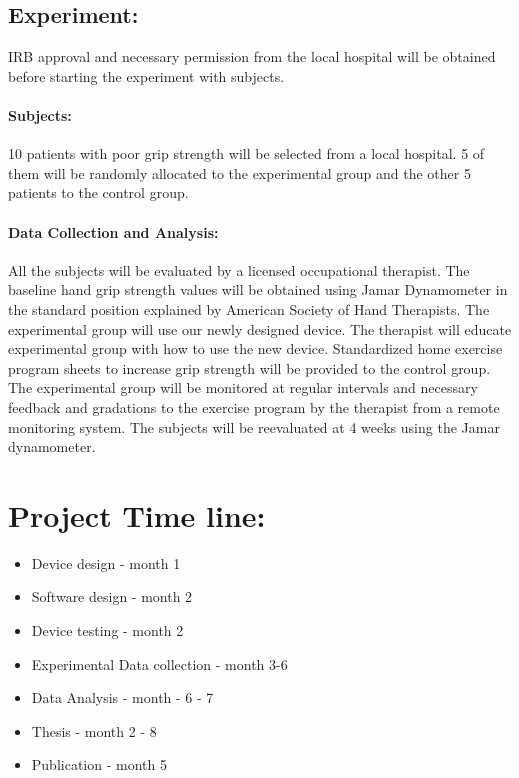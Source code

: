 \documentclass[12pt]{article}
\begin{document}
\subsection{Experiment:}
IRB approval and necessary permission from the local hospital will be obtained before starting the experiment with subjects.
\paragraph{Subjects:} 10 patients with poor grip strength will be selected from a local hospital.  5 of them will be randomly allocated to the experimental group and the other 5 patients to the control group. 
\paragraph{Data Collection and Analysis:} 
All the subjects will be evaluated by a licensed occupational therapist. The baseline hand grip strength values will be obtained using Jamar Dynamometer in the standard position explained by American Society of Hand Therapists. The experimental group will use our newly designed device. The therapist will educate experimental group with how to use the new device. Standardized home exercise program sheets to increase grip strength will be provided to the control group. The experimental group will be monitored at regular intervals and necessary feedback and gradations to the exercise program by the therapist from a remote monitoring system. 
The subjects will be reevaluated at 4 weeks using the Jamar dynamometer. 

\section{Project Time line:}
\begin{itemize}
\item Device design -  month 1 
\item Software design - month 2 
\item Device testing -  month 2 
\item Experimental Data collection  - month 3-6 
\item Data Analysis - month - 6 - 7 
\item Thesis - month 2 - 8 
\item Publication - month 5 
\end{itemize}
\end{document}
